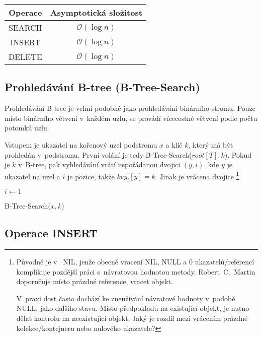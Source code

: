 \begin{tabular}{|c|c|}
\hline 
Operace & Asymptotická složitost\tabularnewline
\hline 
\hline 
SEARCH & $\mathcal{O}(\log n)$\tabularnewline
\hline 
INSERT & $\mathcal{O}(\log n)$\tabularnewline
\hline 
DELETE & $\mathcal{O}(\log n)$\tabularnewline
\hline 
\end{tabular}


\subsection{Prohledávání B-tree (B-Tree-Search)}

Prohledávání B-tree je velmi podobné jako prohledávání binárního stromu\@.
Pouze místo binárního větvení v~každém uzlu, se provádí vícecestné
větvení podle počtu potomků uzlu\@.

Vstupem je ukazatel na kořenový uzel podstromu $x$ a klíč $k$, který
má být prohledán v~podstromu\@. První volání je tedy B-Tree-Search($root[T],k$).
Pokud je $k$ v~B-tree, pak vyhledávání vrátí uspořádanou dvojici
$(y,i)$, kde $y$ je ukazatel na uzel a $i$ je pozice, takže $key_{i}[y]=k$\@.
Jinak je vrácena  dvojice%
\footnote{Původně je v~\cite{Cormen:2001:IA:580470} NIL, jenže obecně vracení
NIL, NULL a 0 ukazatelů/referencí komplikuje pozdější práci s~návratovou
hodnotou metody. Robert~C.~Martin doporučuje místo prázdné
reference, vracet  objekt\cite{martin2009clean}.

V~praxi dost často dochází ke zneužívání návratové hodnoty v~podobě
NULL, jako dalšího stavu. Místo předpokladu na existující objekt,
je nutno dělat kontrolu na neexistující objekt. Jaký je rozdíl mezi
vrácením prázdné kolekce/kontejneru nebo nulového ukazatele?%
}\@.

\begin{algorithm}[t]
\SetAlgoLined
{}

$i \longleftarrow 1$\\

\caption{B-Tree-Search($x,k$)}
\end{algorithm}



\subsection{Operace INSERT}

